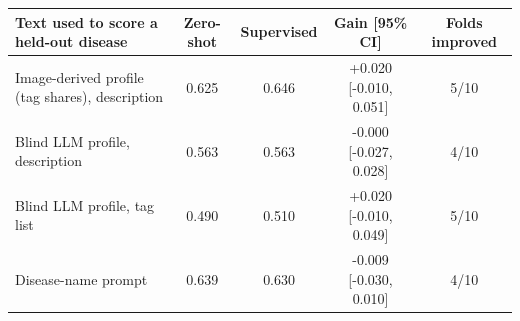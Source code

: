 \begin{tabular}{lcccc}\toprule Text used to score a held-out disease & Zero-shot & Supervised & Gain [95\% CI] & Folds improved\\\midrule
Image-derived profile (tag shares), description & 0.625 & 0.646 & +0.020 [-0.010, 0.051] & 5/10\\
Blind LLM profile, description & 0.563 & 0.563 & -0.000 [-0.027, 0.028] & 4/10\\
Blind LLM profile, tag list & 0.490 & 0.510 & +0.020 [-0.010, 0.049] & 5/10\\
Disease-name prompt & 0.639 & 0.630 & -0.009 [-0.030, 0.010] & 4/10\\
\bottomrule\end{tabular}
